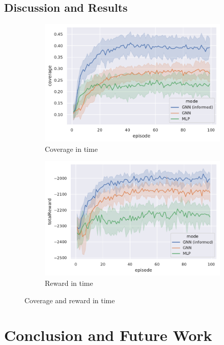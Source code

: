 \documentclass[conference]{IEEEtran}
\begin{document}
\subsection{Discussion and Results}

\begin{figure}
  \centering
  \begin{subfigure}[b]{\linewidth}
    \includegraphics[width=\linewidth]{imgs/coverage-in-time}
    \caption{Coverage in time}
    \label{fig:coverage}
  \end{subfigure}
  \begin{subfigure}[b]{\linewidth}
    \includegraphics[width=\linewidth]{imgs/reward-in-time}
    \caption{Reward in time}
    \label{fig:reward}
  \end{subfigure}
  \caption{Coverage and reward in time}
  \label{fig:coverage-reward}
\end{figure}
\section{Conclusion and Future Work}
\label{sec:conclusion}



\end{document}
